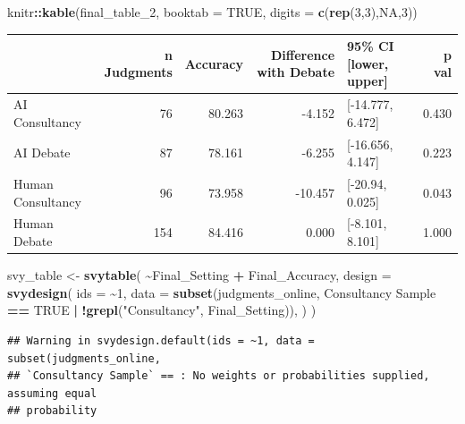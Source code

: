 \documentclass[
]{article}
\newenvironment{Shaded}{\begin{snugshade}}{\end{snugshade}}
\newcommand{\AttributeTok}[1]{\textcolor[rgb]{0.13,0.29,0.53}{#1}}
\newcommand{\ConstantTok}[1]{\textcolor[rgb]{0.56,0.35,0.01}{#1}}
\newcommand{\DecValTok}[1]{\textcolor[rgb]{0.00,0.00,0.81}{#1}}
\newcommand{\FunctionTok}[1]{\textcolor[rgb]{0.13,0.29,0.53}{\textbf{#1}}}
\newcommand{\NormalTok}[1]{#1}
\newcommand{\OtherTok}[1]{\textcolor[rgb]{0.56,0.35,0.01}{#1}}
\newcommand{\SpecialCharTok}[1]{\textcolor[rgb]{0.81,0.36,0.00}{\textbf{#1}}}
\newcommand{\StringTok}[1]{\textcolor[rgb]{0.31,0.60,0.02}{#1}}
\begin{document}
\begin{Shaded}
\begin{Highlighting}[]
\NormalTok{knitr}\SpecialCharTok{::}\FunctionTok{kable}\NormalTok{(final\_table\_2, }\AttributeTok{booktab =} \ConstantTok{TRUE}\NormalTok{, }\AttributeTok{digits =} \FunctionTok{c}\NormalTok{(}\FunctionTok{rep}\NormalTok{(}\DecValTok{3}\NormalTok{,}\DecValTok{3}\NormalTok{),}\ConstantTok{NA}\NormalTok{,}\DecValTok{3}\NormalTok{))}
\end{Highlighting}
\end{Shaded}

\begin{tabular}{lrrrlr}
\toprule
  & n Judgments & Accuracy & Difference with Debate & 95\% CI [lower, upper] & p val\\
\midrule
AI Consultancy & 76 & 80.263 & -4.152 & {}[-14.777, 6.472] & 0.430\\
AI Debate & 87 & 78.161 & -6.255 & {}[-16.656, 4.147] & 0.223\\
Human Consultancy & 96 & 73.958 & -10.457 & {}[-20.94, 0.025] & 0.043\\
Human Debate & 154 & 84.416 & 0.000 & {}[-8.101, 8.101] & 1.000\\
\bottomrule
\end{tabular}

\begin{Shaded}
\begin{Highlighting}[]
\NormalTok{svy\_table }\OtherTok{\textless{}{-}} \FunctionTok{svytable}\NormalTok{(}
  \SpecialCharTok{\textasciitilde{}}\NormalTok{Final\_Setting }\SpecialCharTok{+}\NormalTok{ Final\_Accuracy, }
  \AttributeTok{design =} \FunctionTok{svydesign}\NormalTok{(}
    \AttributeTok{ids =} \SpecialCharTok{\textasciitilde{}}\DecValTok{1}\NormalTok{, }
    \AttributeTok{data =} \FunctionTok{subset}\NormalTok{(judgments\_online, }\StringTok{\textasciigrave{}}\AttributeTok{Consultancy Sample}\StringTok{\textasciigrave{}} \SpecialCharTok{==} \ConstantTok{TRUE} \SpecialCharTok{|} \SpecialCharTok{!}\FunctionTok{grepl}\NormalTok{(}\StringTok{"Consultancy"}\NormalTok{, Final\_Setting)),}
\NormalTok{  )}
\NormalTok{)}
\end{Highlighting}
\end{Shaded}

\begin{verbatim}
## Warning in svydesign.default(ids = ~1, data = subset(judgments_online,
## `Consultancy Sample` == : No weights or probabilities supplied, assuming equal
## probability
\end{verbatim}
\end{document}
